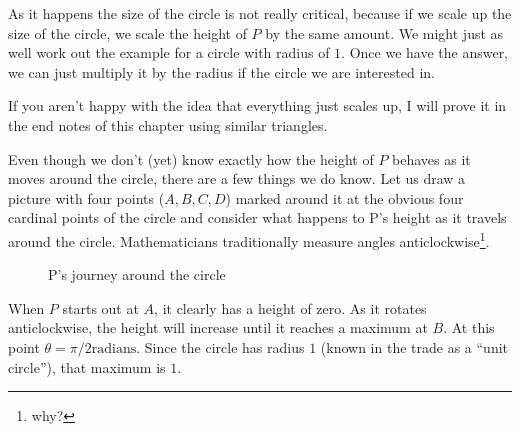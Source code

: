 \documentclass[main.tex]{subfiles}
\begin{document}
As it happens the size of the circle is not really critical, because if we scale up the size of the circle, we scale the height of $P$ by the same amount. We might just as well work out the example for a circle with radius of $1$. Once we have the answer, we can just multiply it by the radius if the circle we are interested in.

If you aren't happy with the idea that everything just scales up, I will prove it in the end notes of this chapter using similar triangles.

Even though we don't (yet) know exactly how the height of $P$ behaves as it moves around the circle, there are a few things we do know. Let us draw a picture with four points ($A, B, C, D$) marked around it at the obvious four cardinal points of the circle and consider what happens to P's height as it travels around the circle. Mathematicians traditionally measure angles anticlockwise\footnote{why?}.

\begin{figure}[H]
  \label{fig:sine1}
  \caption{P's journey around the circle}
  
\end{figure}

When $P$ starts out at $A$, it clearly has a height of zero. As it rotates anticlockwise, the height will increase until it reaches a maximum at $B$. At this point $\theta=\pi/2 \text{radians}$. Since the circle has radius $1$ (known in the trade as a ``unit circle''), that maximum is $1$. 
\end{document}
